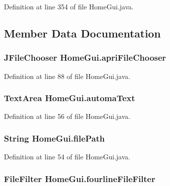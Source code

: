 Definition at line 354 of file Home\-Gui.\-java.



\subsection{Member Data Documentation}
\hypertarget{class_home_gui_a7b615d195d8208fab52fd9db85082d46}{
\subsubsection[{apri\-File\-Chooser}]{\setlength{\rightskip}{0pt plus 5cm}J\-File\-Chooser {\bf Home\-Gui.\-apri\-File\-Chooser}}}\label{class_home_gui_a7b615d195d8208fab52fd9db85082d46}


Definition at line 88 of file Home\-Gui.\-java.

\hypertarget{class_home_gui_a6b00edbcb893105ddc5e3b2beb4c2dca}{
\subsubsection[{automa\-Text}]{\setlength{\rightskip}{0pt plus 5cm}Text\-Area {\bf Home\-Gui.\-automa\-Text}}}\label{class_home_gui_a6b00edbcb893105ddc5e3b2beb4c2dca}


Definition at line 56 of file Home\-Gui.\-java.

\hypertarget{class_home_gui_a1f9226407f1c2c6ff8d62f84dfcebfbe}{
\subsubsection[{file\-Path}]{\setlength{\rightskip}{0pt plus 5cm}String {\bf Home\-Gui.\-file\-Path}}}\label{class_home_gui_a1f9226407f1c2c6ff8d62f84dfcebfbe}


Definition at line 54 of file Home\-Gui.\-java.

\hypertarget{class_home_gui_a7f56e390a2982689b92cee117f50e987}{
\subsubsection[{fourline\-File\-Filter}]{\setlength{\rightskip}{0pt plus 5cm}File\-Filter {\bf Home\-Gui.\-fourline\-File\-Filter}}}\label{class_home_gui_a7f56e390a2982689b92cee117f50e987}


